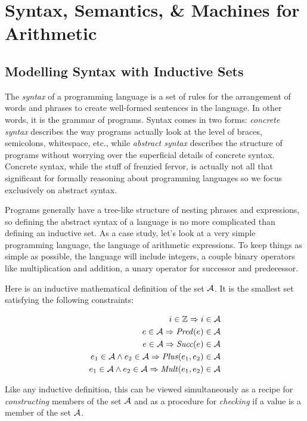 \section{Syntax, Semantics, \& Machines for Arithmetic}

  \subsection{Modelling Syntax with Inductive Sets}

  The \emph{syntax} of a programming language is a set of rules for the
    arrangement of words and phrases to create well-formed sentences in
  the language.  In other words, it is the grammar of programs.  Syntax
    comes in two forms: \emph{concrete syntax} describes the way programs
	       actually look at the level of braces, semicolons, whitespace, etc.,
while \emph{abstract syntax} describes the structure of programs
without worrying over the superficial details of concrete syntax.
Concrete syntax, while the stuff of frenzied fervor, is actually not
all that significant for formally reasoning about programming
languages so we focus exclusively on abstract syntax.

Programs generally have a tree-like structure of nesting phrases and
expressions, so defining the abstract syntax of a language is no more
complicated than defining an inductive set.
%
As a case study, let's look at a very simple programming language, the
language of arithmetic expressions.  To keep things as simple as
possible, the language will include integers, a couple binary
operators like multiplication and addition, a unary operator for
successor and predecessor.

Here is an inductive mathematical definition of the set
$\mathcal{A}$.  It is the smallest set satisfying the following
constraints:

\begin{align}
i \in \mathbb{Z} \Rightarrow i \in \mathcal{A}\\
e \in \mathcal{A} \Rightarrow \mathit{Pred}(e) \in \mathcal{A}\\
e \in \mathcal{A} \Rightarrow \mathit{Succ}(e) \in \mathcal{A}\\
e_1 \in \mathcal{A} \wedge e_2 \in \mathcal{A} \Rightarrow \mathit{Plus}(e_1,e_2) \in \mathcal{A}\\
e_1 \in \mathcal{A} \wedge e_2 \in \mathcal{A} \Rightarrow \mathit{Mult}(e_1,e_2) \in \mathcal{A}
\end{align}


Like any inductive definition, this can be viewed simultaneously as a
recipe for \emph{constructing} members of the set $\mathcal{A}$ and as a
procedure for \emph{checking} if a value is a member of the set $\mathcal{A}$.

